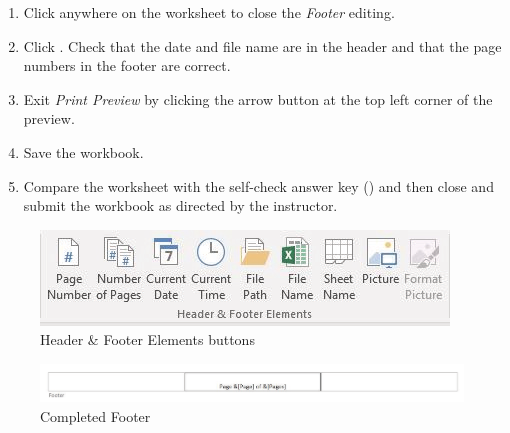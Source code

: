 \begin{enumbox}
\begin{enumerate}
		\item Click anywhere on the worksheet to close the \textit{Footer} editing.
		\item Click . Check that the date and file name are in the header and that the page numbers in the footer are correct.
		\item Exit \textit{Print Preview} by clicking the arrow button at the top left corner of the preview.
		\item Save the  workbook.
		\item Compare the worksheet with the self-check answer key () and then close and submit the  workbook as directed by the instructor.
	\end{enumerate}
\end{enumbox}
	
\begin{figure}[H]
	\centering
	\includegraphics[width=\maxwidth{.95\linewidth}]{gfx/ch03_fig32}
	\caption{Header \& Footer Elements buttons}
	\label{03:fig32}
\end{figure}

\begin{figure}[H]
	\centering
	\includegraphics[width=\maxwidth{.95\linewidth}]{gfx/ch03_fig33}
	\caption{Completed Footer}
	\label{03:fig33}
\end{figure}

